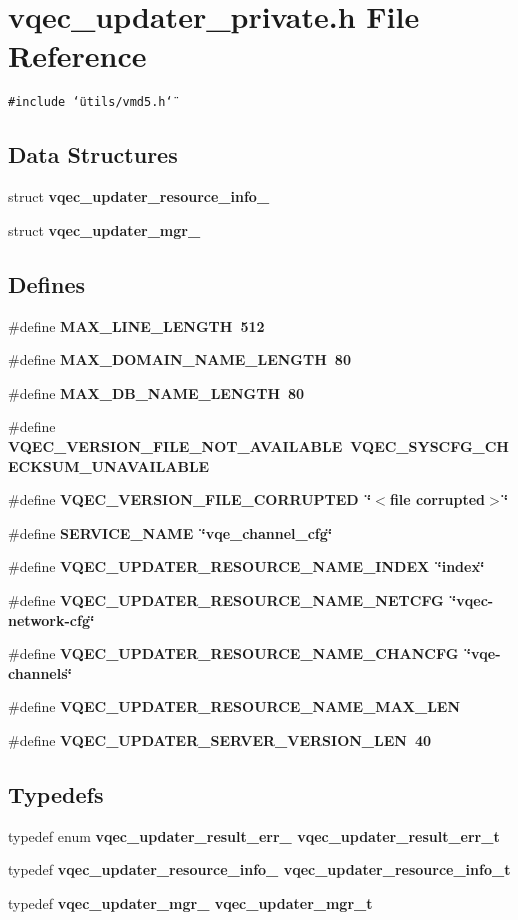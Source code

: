 \section{vqec\_\-updater\_\-private.h File Reference}
\label{vqec__updater__private_8h}
{\tt \#include \char`\"{}utils/vmd5.h\char`\"{}}\par
\subsection*{Data Structures}
\begin{CompactItemize}
\item 
struct \bf{vqec\_\-updater\_\-resource\_\-info\_\-}
\item 
struct \bf{vqec\_\-updater\_\-mgr\_\-}
\end{CompactItemize}
\subsection*{Defines}
\begin{CompactItemize}
\item 
\#define \bf{MAX\_\-LINE\_\-LENGTH}~512
\item 
\#define \bf{MAX\_\-DOMAIN\_\-NAME\_\-LENGTH}~80
\item 
\#define \bf{MAX\_\-DB\_\-NAME\_\-LENGTH}~80
\item 
\#define \bf{VQEC\_\-VERSION\_\-FILE\_\-NOT\_\-AVAILABLE}~VQEC\_\-SYSCFG\_\-CHECKSUM\_\-UNAVAILABLE
\item 
\#define \bf{VQEC\_\-VERSION\_\-FILE\_\-CORRUPTED}~\char`\"{}$<$file corrupted$>$\char`\"{}
\item 
\#define \bf{SERVICE\_\-NAME}~\char`\"{}vqe\_\-channel\_\-cfg\char`\"{}
\item 
\#define \bf{VQEC\_\-UPDATER\_\-RESOURCE\_\-NAME\_\-INDEX}~\char`\"{}index\char`\"{}
\item 
\#define \bf{VQEC\_\-UPDATER\_\-RESOURCE\_\-NAME\_\-NETCFG}~\char`\"{}vqec-network-cfg\char`\"{}
\item 
\#define \bf{VQEC\_\-UPDATER\_\-RESOURCE\_\-NAME\_\-CHANCFG}~\char`\"{}vqe-\bf{channels}\char`\"{}
\item 
\#define \bf{VQEC\_\-UPDATER\_\-RESOURCE\_\-NAME\_\-MAX\_\-LEN}
\item 
\#define \bf{VQEC\_\-UPDATER\_\-SERVER\_\-VERSION\_\-LEN}~40
\end{CompactItemize}
\subsection*{Typedefs}
\begin{CompactItemize}
\item 
typedef enum \bf{vqec\_\-updater\_\-result\_\-err\_\-} \bf{vqec\_\-updater\_\-result\_\-err\_\-t}
\item 
typedef \bf{vqec\_\-updater\_\-resource\_\-info\_\-} \bf{vqec\_\-updater\_\-resource\_\-info\_\-t}
\item 
typedef \bf{vqec\_\-updater\_\-mgr\_\-} \bf{vqec\_\-updater\_\-mgr\_\-t}
\end{CompactItemize}
